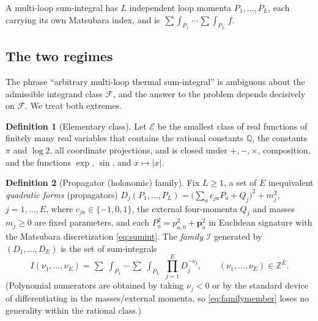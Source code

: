 \documentclass{amsart}
\theoremstyle{definition}
\newtheorem{definition}{Definition}
\begin{document}
A multi-loop sum-integral has $L$ independent loop momenta
$P_1,\dots,P_L$, each carrying its own Matsubara index, and is
$\mathop{\sum\!\!\!\int}_{P_1}\!\cdots\mathop{\sum\!\!\!\int}_{P_L}f$.

\subsection{The two regimes}
The phrase ``arbitrary multi-loop thermal sum-integral'' is ambiguous about
the admissible integrand class $\mathcal F$, and the answer to the problem
depends decisively on $\mathcal F$. We treat both extremes.

\begin{definition}[Elementary class]\label{def:elem}
Let $\mathcal E$ be the smallest class of real functions of finitely many real
variables that contains the rational constants $\mathbb Q$, the constants
$\pi$ and $\log 2$, all coordinate projections, and is closed under
$+,-,\times$, composition, and the functions $\exp$, $\sin$, and
$x\mapsto|x|$.
\end{definition}

\begin{definition}[Propagator (holonomic) family]\label{def:family}
Fix $L\geq1$, a set of $E$ inequivalent \emph{quadratic forms}
(propagators)
$D_j(P_1,\dots,P_L)=\big(\sum_a c_{ja}P_a + Q_j\big)^2 + m_j^2$,
$j=1,\dots,E$,
where $c_{ja}\in\{-1,0,1\}$, the external four-momenta $Q_j$ and masses
$m_j\geq0$ are fixed parameters, and each $P_a^2=p_{a,0}^2+\mathbf p_a^2$ in
Euclidean signature with the Matsubara discretization \eqref{eq:sumint}. The
\emph{family} $\mathcal I$ generated by $(D_1,\dots,D_E)$ is the set of
sum-integrals
\begin{equation}\label{eq:familymember}
  I(\nu_1,\dots,\nu_E)
  =\mathop{\textstyle\sum\!\!\!\!\!\!\int}_{P_1}\!\!\cdots
   \mathop{\textstyle\sum\!\!\!\!\!\!\int}_{P_L}
   \ \prod_{j=1}^{E} D_j^{-\nu_j},
   \qquad (\nu_1,\dots,\nu_E)\in\mathbb Z^{E}.
\end{equation}
(Polynomial numerators are obtained by taking $\nu_j<0$ or by the standard
device of differentiating in the masses/external momenta, so
\eqref{eq:familymember} loses no generality within the rational class.)
\end{definition}
\end{document}
